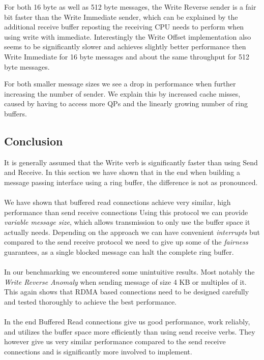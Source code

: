 For both 16 byte as well as 512 byte messages, the Write Reverse sender is a fair bit faster than the Write Immediate sender,
which can be explained by the additional receive buffer reposting the receiving CPU needs to perform when using write with
immediate. Interestingly the Write Offset implementation also seems to be significantly slower and achieves slightly better
performance then Write Immediate for 16 byte messages and about the same throughput for 512 byte messages.~

For both smaller message sizes we see a drop in performance when further increasing the number of sender. We explain 
this by increased cache misses, caused by having to access more QPs and the linearly growing number of ring buffers.


\subsection{Conclusion}

It is generally assumed that the Write verb is significantly faster than using Send and Receive. In this section we have 
shown that in the end when building a message passing interface using a ring buffer, the difference is not as pronounced.


\paragraph{} We have shown that buffered read connections achieve very similar, high performance than send receive connections
Using this protocol we can provide \emph{variable message size}, which allows transmission to only use the buffer space it 
actually needs. Depending on the approach we can have convenient \emph{interrupts} but compared to the send receive protocol
we need to give up some of the \emph{fairness} guarantees, as a single blocked message can halt the complete ring buffer.

\paragraph{} In our benchmarking we encountered some unintuitive results. Most notably the \emph{Write Reverse Anomaly} when 
sending message of size 4 KB or multiples of it. This again shows that RDMA based connections need to be designed carefully
and tested thoroughly to achieve the best performance.

\paragraph{} In the end Buffered Read connections give us good performance, work reliably, and utilizes the buffer space more
efficiently than using send receive verbs. They however give us very similar performance compared to the send receive 
connections and is significantly more involved to implement.









